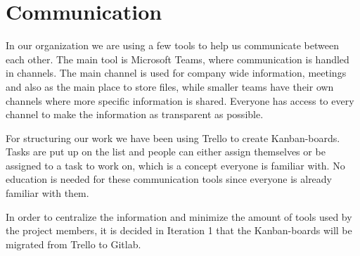 \section{Communication}
\label{sec:communication}

In our organization we are using a few tools to help us communicate between each other. The main tool is Microsoft Teams, where communication is handled in channels. The main channel is used for company wide information, meetings and also as the main place to store files, while smaller teams have their own channels where more specific information is shared. Everyone has access to every channel to make the information as transparent as possible.

For structuring our work we have been using Trello to create Kanban-boards. Tasks are put up on the list and people can either assign themselves or be assigned to a task to work on, which is a concept everyone is familiar with. No education is needed for these communication tools since everyone is already familiar with them.

In order to centralize the information and minimize the amount of tools used by the project members, it is decided in Iteration 1 that the Kanban-boards will be migrated from Trello to Gitlab. 